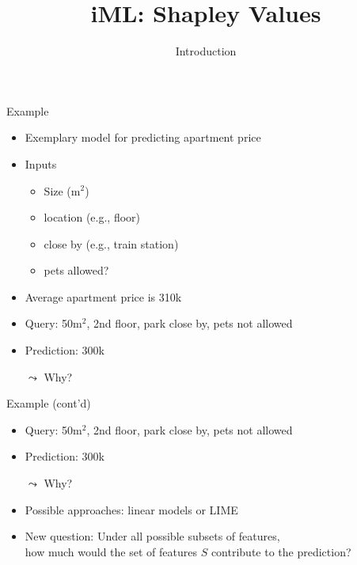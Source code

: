 \documentclass[aspectratio=169]{../latex_main/tntbeamer}  %
\title[Introduction]{iML: Shapley Values}
\subtitle{Introduction}
\begin{document}
	
	\maketitle
	
	\begin{frame}[c]{Example}
	
	\begin{itemize}
	    \item Exemplary model for predicting apartment price
	    \item Inputs
	    \begin{itemize}
	        \item Size (m$^2$)
	        \item location (e.g., floor)
	        \item close by (e.g., train station)
	        \item pets allowed?
	    \end{itemize}
	    \item Average apartment price is 310k
	    \pause
	    \bigskip
	    \item Query: 50m$^2$, 2nd floor, park close by, pets not allowed
	    \item Prediction: 300k
	    \item[$\leadsto$] Why?
	\end{itemize}
	
	\end{frame}

\begin{frame}[c]{Example (cont'd)}
	
	\begin{itemize}
	    \item Query: 50m$^2$, 2nd floor, park close by, pets not allowed
	    \item Prediction: 300k
	    \item[$\leadsto$] Why?
	    \bigskip
        \item Possible approaches: linear models or LIME
        \item \alert{New question:} Under all possible subsets of features,\\ how much would the set of features $S$ contribute to the prediction?
	\end{itemize}
	
\end{frame}
\end{document}

